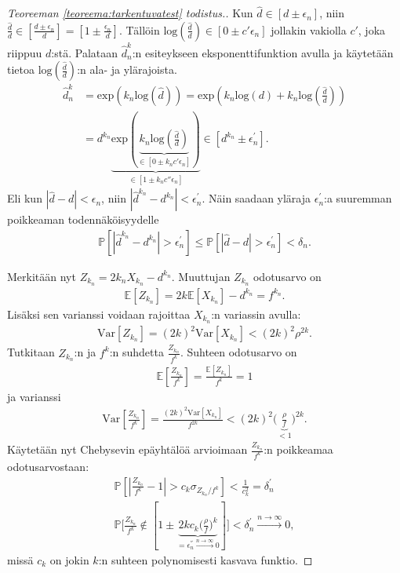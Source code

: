 \documentclass[finnish,12pt,a4paper,pdftex,sci,utf8]{aaltothesis}
\begin{document}
\begin{proof}[Teoreeman \ref{teoreema:tarkentuvatest} todistus.]
	Kun $\hat{d} \in [d \pm \epsilon_{n}^{}]$, niin $\frac{\hat{d}}{d} \in [\frac{d \pm \epsilon_{n}^{}}{d}] = [1 \pm \frac{\epsilon_{n}^{}}{d}]$. Tällöin $\text{log}(\frac{\hat{d}}{d}) \in [0 \pm c'\epsilon_{n}^{}]$ jollakin vakiolla $c'$, joka riippuu $d$:stä.
	Palataan $\hat{d}^k_n$:n esiteykseen eksponenttifunktion avulla ja käytetään tietoa $\text{log}(\frac{\hat{d}}{d})$:n ala- ja ylärajoista.
	\begin{align*}
		\hat{d}^k_n &= \text{exp}(k_n \text{log}(\hat{d})) = \text{exp}(k_n\text{log}(d) + k_n \text{log}(\frac{\hat{d}}{d})) \\
		&= d^{k_n} \underbrace{\text{exp}(\underbrace{k_n \text{log}(\frac{\hat{d}}{d})}_{\in [0 \pm k_n c' \epsilon_{n}^{}]})}_{\in [1 \pm k_n c'' \epsilon_{n}^{}]} \in [d^{k_n} \pm \epsilon_{n}^{'}].
	\end{align*}
	Eli  kun $|\hat{d} - d| < \epsilon_{n}^{}$, niin $|\hat{d}^{k_n} - d^{k_n}| < \epsilon_{n}^{'}$. Näin saadaan yläraja $\epsilon_{n}^{'}$:a suuremman poikkeaman todennäköisyydelle
	\begin{align*}
		\mathbb{P}[|\hat{d}^{k_{n}} - d^{k_{n}}| > \epsilon_{n}^{'}] \leq \mathbb{P}[|\hat{d} - d| > \epsilon_{n}^{'}] < \delta_n.
	\end{align*}

	Merkitään nyt $Z_{k_{n}} = 2k_n X_{k_n} - d^{k_n}$. Muuttujan $Z_{k_n}$ odotusarvo on
	\begin{align*}
		\mathbb{E}[Z_{k_n}] = 2k \mathbb{E}[X_{k_n}] - d^{k_n} = f^{k_n}.
	\end{align*}
	Lisäksi sen varianssi voidaan rajoittaa $X_{k_n}$:n variassin avulla:
	\begin{align*}
		\text{Var}[Z_{k_n}] = (2k)^2\text{Var}[X_{k_n}] < (2k)^2 \rho^{2k}.
	\end{align*}
	Tutkitaan $Z_{k_n}$:n ja $f^k$:n suhdetta $\frac{Z_{k_n}}{f^k}$. Suhteen odotusarvo on
	\begin{align*}
		\mathbb{E}[\frac{Z_{k_n}}{f^k}] = \frac{\mathbb{E}[Z_{k_n}]}{f^k} = 1
	\end{align*}
	ja varianssi
	\begin{align*}
		\text{Var}[\frac{Z_{k_n}}{f^k}] = \frac{(2k)^2 \text{Var}[X_{k_n}]}{f^{2k}} < (2k)^{2} \big(\underbrace{\frac{\rho}{f} }_{ < 1}\big)^{2k}.
	\end{align*}
	Käytetään nyt Chebysevin epäyhtälöä arvioimaan $\frac{Z_{k_n}}{f^k}$:n poikkeamaa odotusarvostaan:
	\begin{align*}
		\mathbb{P}[|\frac{Z_{k_n}}{f^k} - 1| > c_k \sigma_{Z_{k_n}/f^k}] < \frac{1}{c_k^2}  = \delta_{n}^{'} \\
		\mathbb{P} \big[\frac{Z_{k_n}}{f^k} \notin [1 \pm \underbrace{2 k c_k \big( \frac{\rho}{f}\big)^k}_{= \epsilon_{n}^{''} \xrightarrow{n \rightarrow \infty} 0}] \big] < \delta_{n}^{'} \xrightarrow{n \rightarrow \infty} 0,
	\end{align*}
	missä $c_k$ on jokin $k$:n suhteen polynomisesti kasvava funktio.


\end{proof}
\end{document}

